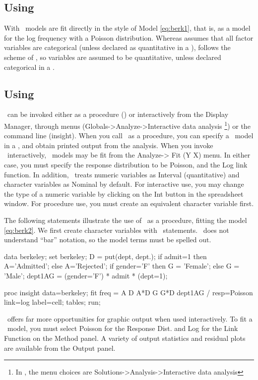 

\subsection{Using }
With  \loglin\ models are fit directly in the style of
Model \eqref{eq:berk1},
that is, as a model for the log frequency with a Poisson distribution.
Whereas  assumes that all factor variables are categorical
(unless declared as quantitative in a ),
 follows the scheme of , so variables are assumed
to be quantitative, unless declared categorical in a
.




\subsection{Using \INSIGHT}
\INSIGHT\ can be invoked either as a procedure ()
or interactively from the Display Manager, through menus (\textsf{Globals}->\textsf{Analyze}->\textsf{Interactive data analysis}%
\footnote{In , the menu choices are
\textsf{Solutions}->\textsf{Analysis}->\textsf{Interactive data analysis}})
or the command line (\textsf{insight}).
When you call \INSIGHT\ as a procedure, you can specify a \loglin\
model in a , and obtain printed output from the
analysis.
When you invoke \INSIGHT\ interactively,
 \loglin\ models may be fit from the \textsf{Analyze}->
\textsf{Fit (Y X)} menu.
In either case, you must specify the response distribution to be Poisson,
and the Log link function.
In addition, \INSIGHT\ treats numeric variables as Interval (quantitative)
and character variables as Nominal by default.  For interactive use, you may
change the type of a numeric variable by clicking on the \textsf{Int} button
in the spreadsheet window.  For procedure use, you must create an
equivalent character variable first.

The following statements illustrate the use of \INSIGHT\ as a procedure,
fitting the model \eqref{eq:berk2}.  We first create character variables
\pname{A D G} with \Dstp\ statements.  
\INSIGHT\ does not understand ``bar'' notation, so the
model terms must be spelled out.

\begin{listing}
data berkeley;
   set berkeley;
   D = put(dept, dept.);
   if admit=1
      then A='Admitted';
      else A='Rejected';
   if gender='F'
      then G = 'Female';
      else G = 'Male';
   dept1AG = (gender='F') * admit * (dept=1);

proc insight data=berkeley;
   fit freq = A D A*D G G*D dept1AG / resp=Poisson link=log label=cell;
   tables;
run;
\end{listing}
\INSIGHT\ offers far more opportunities for graphic output when used
interactively.  To fit a \loglin\ model, you must select
Poisson for the \textsf{Response Dist.} and Log for the
\textsf{Link Function} on the \textsf{Method} panel.
A variety of output statistics and residual plots are available from
the \textsf{Output} panel.

